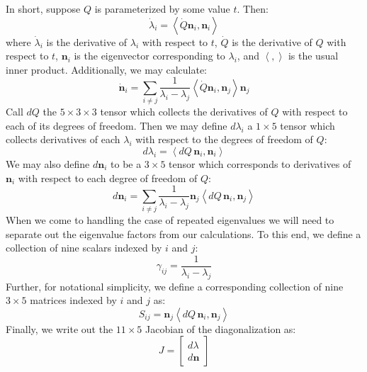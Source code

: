 \documentclass[reqno]{article}
\begin{document}
In short, suppose $Q$ is parameterized by some value $t$.
Then:
\begin{equation}
    \dot{\lambda}_i
    =
    \left< \dot{Q} \mathbf{n}_i, \mathbf{n}_i \right>
\end{equation}
where $\dot{\lambda}_i$ is the derivative of $\lambda_i$ with respect to $t$, $\dot{Q}$ is the derivative of $Q$ with respect to $t$, $\mathbf{n}_i$ is the eigenvector corresponding to $\lambda_i$, and $\left< , \right>$ is the usual inner product.
Additionally, we may calculate:
\begin{equation}
    \dot{\mathbf{n}}_i
    =
    \sum_{i \neq j}
    \frac{1}{\lambda_i - \lambda_j}
    \left< \dot{Q} \mathbf{n}_i, \mathbf{n}_j \right> \mathbf{n}_j
\end{equation}
Call $dQ$ the $5 \times 3 \times 3$ tensor which collects the derivatives of $Q$ with respect to each of its degrees of freedom.
Then we may define $d\lambda_i$ a $1 \times 5$ tensor which collects derivatives of each $\lambda_i$ with respect to the degrees of freedom of $Q$:
\begin{equation}
    d\lambda_i
    =
    \left< dQ \, \mathbf{n}_i, \mathbf{n}_i \right>
\end{equation}
We may also define $d\mathbf{n}_i$ to be a $3 \times 5$ tensor which corresponds to derivatives of $\mathbf{n}_i$ with respect to each degree of freedom of $Q$:
\begin{equation}
    d\mathbf{n}_i
    =
    \sum_{i \neq j}
    \frac{1}{\lambda_i - \lambda_j}
    \mathbf{n}_j \left< dQ \, \mathbf{n}_i, \mathbf{n}_j \right>
\end{equation}
When we come to handling the case of repeated eigenvalues we will need to separate out the eigenvalue factors from our calculations.
To this end, we define a collection of nine scalars indexed by $i$ and $j$:
\begin{equation}
    \gamma_{ij} = \frac{1}{\lambda_i - \lambda_j}
\end{equation}
Further, for notational simplicity, we define a corresponding collection of nine $3 \times 5$ matrices indexed by $i$ and $j$ as:
\begin{equation}
    S_{ij}
    =
    \mathbf{n}_j \left< dQ \, \mathbf{n}_i, \mathbf{n}_j \right>
\end{equation}
Finally, we write out the $11 \times 5$ Jacobian of the diagonalization as:
\begin{equation}
    J
    =
    \begin{bmatrix}
        d \lambda \\
        d \mathbf{n}
    \end{bmatrix}
\end{equation}
\end{document}

